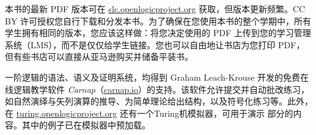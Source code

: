 本书的最新 PDF 版本可在 \href{https://slc.openlogicproject.org}{slc.openlogicproject.org} 获取，但版本更新频繁。CC BY 许可授权您自行下载和分发本书。为了确保在您使用本书的整个学期中，所有学生拥有相同的版本，您应该这样做：将您决定使用的 PDF 上传到您的学习管理系统（LMS），而不是仅仅给学生链接。您也可以自由地让书店为您打印 PDF，但有些书店可以直接从亚马逊购买并储备平装书。

一阶逻辑的语法、语义及证明系统，均得到 Graham Leach-Krouse 开发的免费在线逻辑教学软件 \emph{Carnap}（\href{https://carnap.io}{carnap.io}）的支持。该软件允许提交并自动批改练习，如自然演绎与矢列演算的推导、为简单理论给出结构，以及符号化练习等。此外，在 \href{https://turing.openlogicproject.org}{turing.openlogicproject.org} 还有一个Turing机模拟器，可用于演示  部分的内容。其中的例子已在模拟器中预加载。